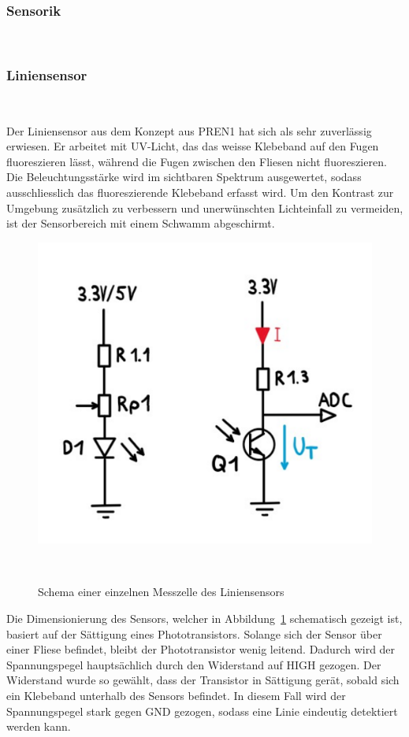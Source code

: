 \documentclass[main.tex]{subfiles} %
\begin{document}

\subsubsection{Sensorik}~\label{sec:Sensorik}

\subsubsection*{Liniensensor}~\label{sec:Sensorik_Liniensensor}

Der Liniensensor aus dem Konzept aus PREN1 hat sich als sehr zuverlässig
erwiesen. Er arbeitet mit UV-Licht, das das weisse Klebeband auf den Fugen
fluoreszieren lässt, während die Fugen zwischen den Fliesen nicht
fluoreszieren. Die Beleuchtungsstärke wird im sichtbaren Spektrum ausgewertet,
sodass ausschliesslich das fluoreszierende Klebeband erfasst wird. Um den
Kontrast zur Umgebung zusätzlich zu verbessern und unerwünschten Lichteinfall
zu vermeiden, ist der Sensorbereich mit einem Schwamm abgeschirmt.

\begin{figure}[H]
  \centering
  \includegraphics[width =
    0.5\linewidth]{./fig_Antriebsregelung_Firmware/Schema_Messzelle_Liniensensor.pdf}
  \caption{Schema einer einzelnen Messzelle des
    Liniensensors}~\label{fig:Schema_Messtelle_Liniensensor}
\end{figure}

Die Dimensionierung des Sensors, welcher in
Abbildung~\ref{fig:Schema_Messtelle_Liniensensor} schematisch gezeigt ist,
basiert auf der Sättigung eines Phototransistors. Solange sich der Sensor über
einer Fliese befindet, bleibt der Phototransistor wenig leitend. Dadurch wird
der Spannungspegel hauptsächlich durch den Widerstand auf HIGH gezogen. Der
Widerstand wurde so gewählt, dass der Transistor in Sättigung gerät, sobald
sich ein Klebeband unterhalb des Sensors befindet. In diesem Fall wird der
Spannungspegel stark gegen GND gezogen, sodass eine Linie eindeutig detektiert
werden kann.
\end{document}
